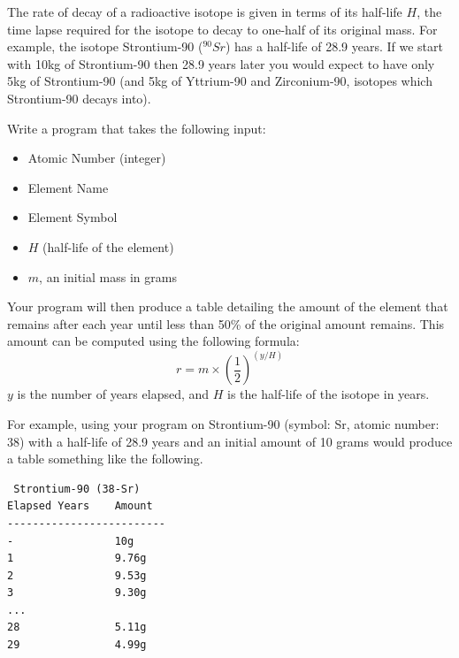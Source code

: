 \begin{exer}
The rate of decay of a radioactive
isotope is given in terms of its half-life $H$, the time lapse required
for the isotope to decay to one-half of its original mass. For example,
the isotope Strontium-90 ($^{90}Sr$) has a half-life of 28.9 years.  If
we start with 10kg of Strontium-90 then 28.9 years later you 
would expect to have only 5kg of Strontium-90 (and 5kg
of Yttrium-90 and Zirconium-90, isotopes which Strontium-90 decays
into).

Write a program that takes the following input:
\begin{itemize}
  \item Atomic Number (integer)
  \item Element Name
  \item Element Symbol
  \item $H$ (half-life of the element)
  \item $m$, an initial mass in grams
\end{itemize}

Your program will then produce a table detailing the amount of the element
that remains after each year until less than 50\% of the original amount remains.
This amount can be computed using the following formula:
  $$r = m \times \left(\frac{1}{2}\right)^{(y/H)}$$
$y$ is the number of years
elapsed, and $H$ is the half-life of the isotope in years.

For example, using your program on Strontium-90 (symbol: Sr, atomic number: 38)
with a half-life of 28.9 years and an initial amount of 10 grams would produce 
a table something like the following.

\begin{verbatim}
 Strontium-90 (38-Sr)
Elapsed Years    Amount
-------------------------
-                10g
1                9.76g
2                9.53g
3                9.30g
...
28               5.11g
29               4.99g
\end{verbatim}
\end{exer}

